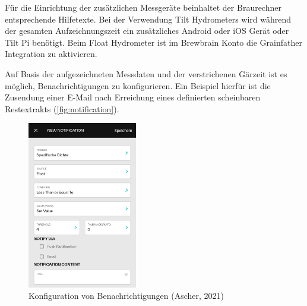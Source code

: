 \documentclass[a4paper,parskip=half]{scrartcl}
\begin{document}
Für die Einrichtung der zusätzlichen Messgeräte beinhaltet
der Braurechner entsprechende Hilfetexte. Bei der
Verwendung Tilt Hydrometers wird während der gesamten
Aufzeichnungszeit ein zusätzliches Android oder iOS Gerät oder
Tilt Pi benötigt. Beim Float Hydrometer ist im Brewbrain Konto
die Grainfather Integration zu aktivieren.

Auf Basis der aufgezeichneten Messdaten und der verstrichenen
Gärzeit ist es möglich, Benachrichtigungen zu konfigurieren.
Ein Beispiel hierfür ist die Zusendung einer E-Mail nach
Erreichung eines definierten scheinbaren Restextrakts
(\autoref{fig:notification}).

\begin{figure}[H]
\centering
\includegraphics[width=4.8cm]{images/gfpc_notification.png}
\caption{Konfiguration von Benachrichtigungen (Ascher, 2021)}
\label{fig:notification}
\end{figure}
\end{document}
